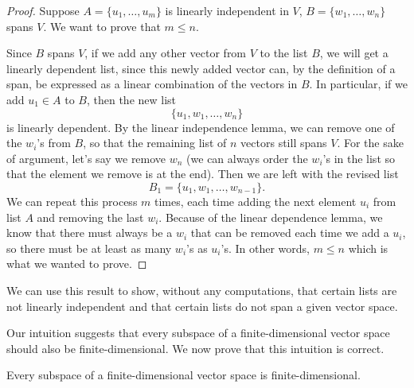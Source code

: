 \begin{proof}
Suppose $A=\{u_1,\dots,u_m\}$ is linearly independent in $V$, $B=\{w_1,\dots,w_n\}$ spans $V$. We want to prove that $m\le n$.

Since $B$ spans $V$, if we add any other vector from $V$ to the list $B$, we will get a linearly dependent list, since this newly added vector can, by the definition of a span, be expressed as a linear combination of the vectors in $B$. In particular, if we add $u_1\in A$ to $B$, then the new list
\[\{u_1,w_1,\dots,w_n\}\]
is linearly dependent. By the linear independence lemma, we can remove one of the $w_i$'s from $B$, so that the remaining list of $n$ vectors still spans $V$. For the sake of argument, let's say we remove $w_n$ (we can always order the $w_i$'s in the list so that the element we remove is at the end). Then we are left with the revised list
\[B_1=\{u_1,w_1,\dots,w_{n-1}\}.\]
We can repeat this process $m$ times, each time adding the next element $u_i$ from list $A$ and removing the last $w_i$. Because of the linear dependence lemma, we know that there must always be a $w_i$ that can be removed each time we add a $u_i$, so there must be at least as many $w_i$'s as $u_i$'s. In other words, $m\le n$ which is what we wanted to prove.
\end{proof}

\begin{remark}
We can use this result to show, without any computations, that certain lists are not linearly independent and that certain lists do not span a given vector space.
\end{remark}

Our intuition suggests that every subspace of a finite-dimensional vector space should also be finite-dimensional. We now prove that this intuition is correct.

\begin{proposition}\label{prop:subspace-finite-dim}
Every subspace of a finite-dimensional vector space is finite-dimensional.
\end{proposition}

